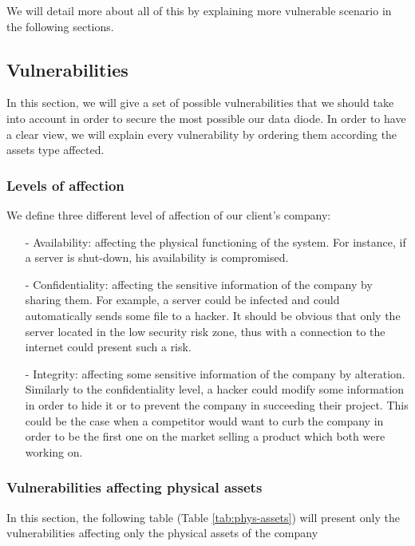 \documentclass[a4paper,10pt]{article}
\begin{document}
We will detail more about all of this by explaining more vulnerable scenario in the following sections.

\subsection{Vulnerabilities}
In this section, we will give a set of possible vulnerabilities that we should take into account in order to secure the most possible our data diode. In order to have a clear view, we will explain every vulnerability by ordering them according the assets type affected.

\subsubsection{Levels of affection}
We define three different level of affection of our client's company:
\begin{enumerate}
\item[-] Availability: affecting the physical functioning of the system. For instance, if a server is shut-down, his availability is compromised.
\item[-] Confidentiality: affecting the sensitive information of the company by sharing them. For example, a server could be infected and could automatically sends some file to a hacker. It should be obvious that only the server located in the low security risk zone, thus with a connection to the internet could present such a risk.
\item[-] Integrity: affecting some sensitive information of the company by alteration. Similarly to the confidentiality level, a hacker could modify some information in order to hide it or to prevent the company in succeeding their project. This could be the case when a competitor would want to curb the company in order to be the first one on the market selling a product which both were working on.
\end{enumerate}

\subsubsection{Vulnerabilities affecting physical assets}
In this section, the following table (Table \ref{tab:phys-assets}) will present only the vulnerabilities affecting only the physical assets of the company
\end{document}
